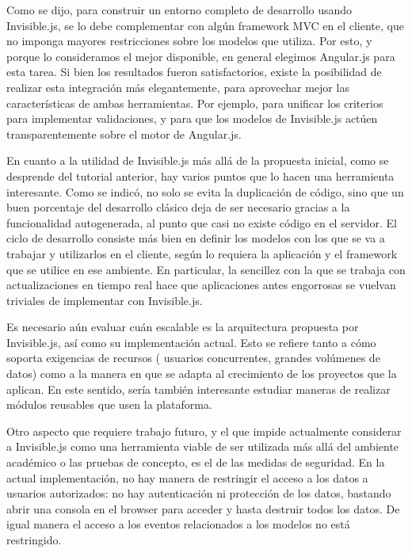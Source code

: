 \documentclass[doc,helv,longtable]{article}
\begin{document}
Como se dijo, para construir un entorno completo de desarrollo usando Invisible.js, se lo debe complementar con algún framework MVC en el cliente, que no imponga mayores restricciones sobre los modelos que utiliza. Por esto, y porque lo consideramos el mejor disponible, en general elegimos Angular.js para esta tarea. Si bien los resultados fueron satisfactorios, existe la posibilidad de realizar esta integración más elegantemente, para aprovechar mejor las características de ambas herramientas. Por ejemplo, para unificar los criterios para implementar validaciones, y para que los modelos de Invisible.js actúen transparentemente sobre el motor de Angular.js.

En cuanto a la utilidad de Invisible.js más allá de la propuesta inicial, como se desprende del tutorial anterior, hay varios puntos que lo hacen una herramienta interesante. Como se indicó, no solo se evita la duplicación de código, sino que un buen porcentaje del desarrollo clásico deja de ser necesario gracias a la funcionalidad autogenerada, al punto que casi no existe código en el servidor. El ciclo de desarrollo consiste más bien en definir los modelos con los que se va a trabajar y utilizarlos en el cliente, según lo requiera la aplicación y el framework que se utilice en ese ambiente. En particular, la sencillez con la que se trabaja con actualizaciones en tiempo real hace que aplicaciones antes engorrosas se vuelvan triviales de implementar con Invisible.js.

Es necesario aún evaluar cuán escalable es la arquitectura propuesta por Invisible.js, así como su implementación actual. Esto se refiere tanto a cómo soporta exigencias de recursos ( usuarios concurrentes, grandes volúmenes de datos) como a la manera en que se adapta al crecimiento de los proyectos que la aplican. En este sentido, sería también interesante estudiar maneras de realizar módulos reusables que usen la plataforma.

Otro aspecto que requiere trabajo futuro, y el que impide actualmente considerar a Invisible.js como una herramienta viable de ser utilizada más allá del ambiente académico o las pruebas de concepto, es el de las medidas de seguridad. En la actual implementación, no hay manera de restringir el acceso a los datos a usuarios autorizados: no hay autenticación ni protección de los datos, bastando abrir una consola en el browser para acceder y hasta destruir todos los datos. De igual manera el acceso a los eventos relacionados a los modelos no está restringido.
\end{document}
